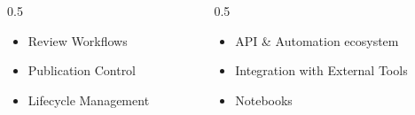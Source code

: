 \begin{frame}
\begin{center}
\begin{columns}[T]
\begin{column}{0.5\textwidth}
{                        {\setlength{\leftmargini}{1.0em}
                        \begin{itemize}
                            \item Review Workflows
                            \item Publication Control
                            \item Lifecycle Management
                        \end{itemize}
                        }
                    }
            \end{column}
            \hfill
            \begin{column}{0.5\textwidth}
                    {
                        {\setlength{\leftmargini}{1.0em}
                        \begin{itemize}
                            \item API \& Automation ecosystem
                            \item Integration with External Tools
                            \item Notebooks
                        \end{itemize}
                        }
                    }
            \end{column}
        \end{columns}
    \end{center}
\end{frame}

